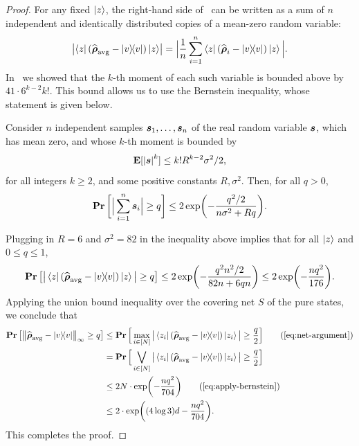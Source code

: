 \documentclass{article}
\begin{document}
\begin{proof}
    For any fixed $\ket{z}$, the right-hand side of~ can be written as a sum of $n$ independent and identically distributed copies of a mean-zero random variable:
    \begin{equation*}
        \abs{\bra{z} (\widehat{\boldsymbol{\rho}}_{\mathrm{avg}} - \ketbra{v}) \ket{z}} = 
        \Big|\frac{1}{n}\sum_{i=1}^n \bra{z} (\widehat{\boldsymbol{\rho}}_i - \ketbra{v}) \ket{z}\Big|.
    \end{equation*}
    In~ we showed that the $k$-th moment of each such variable is bounded above by $41 \cdot 6^{k-2} k!$. This bound allows us to use the Bernstein inequality, whose statement is given below.
    \begin{theorem}
        Consider $n$ independent samples $\boldsymbol{s}_1, \dots, \boldsymbol{s}_n$ of the real random variable $\boldsymbol{s}$, which has mean zero, and whose $k$-th moment is bounded by
        \begin{equation*}
            \mathop{\bf E\/}[\abs{\boldsymbol{s}}^k]\leq k!R^{k-2}\sigma^2/2,
        \end{equation*}
        for all integers $k \geq 2$, and some positive constants $R, \sigma^2$. Then, for all $q > 0$,
        \begin{equation*}
            \mathop{\bf Pr\/}\bigg[\Big|\sum_{i=1}^n \boldsymbol{s}_i\Big| \geq q\bigg] \leq 2 \exp(-\frac{q^2/2}{n\sigma^2 + Rq}).
        \end{equation*}
    \end{theorem}
    \noindent Plugging in $R = 6$ and $\sigma^2 = 82$ in the inequality above implies that for all $\ket{z}$ and $0 \leq q \leq 1$,
    \begin{equation}
        \label{eq:apply-bernstein}
        \mathop{\bf Pr\/}\big[\big|\bra{z} (\widehat{\boldsymbol{\rho}}_{\mathrm{avg}} - \ketbra{v}) \ket{z}\big| \geq q\big] \leq 2\exp(-\frac{q^2n^2/2}{82n + 6qn}) \leq 2\exp(-\frac{nq^2}{176}).
    \end{equation}
    Applying the union bound inequality over the covering net $S$ of the pure states, we conclude that 
    \begin{align*}
        \Pr\big[\norm{\widehat{\brho}_{\mathrm{avg}} - \ketbra{v}}_{\infty} \geq q\big]
        &\leq \Pr\Big[\max_{i \in [N]} \big|\bra{z_i} (\widehat{\brho}_{\mathrm{avg}} - \ketbra{v}) \ket{z_i}\big| \geq \frac{q}{2}\Big] \tag{\Cref{eq:net-argument}} \\
        &= \Pr\Big[\bigvee_{i \in [N]} \big|\bra{z_i} (\widehat{\brho}_{\mathrm{avg}} - \ketbra{v}) \ket{z_i}\big| \geq \frac{q}{2}\Big]  \\
        &\leq 2N \cdot\exp(-\frac{nq^2}{704}) \tag{\Cref{eq:apply-bernstein}} \\
        &\leq 2 \cdot \exp((4\log 3)d-\frac{nq^2}{704}).
    \end{align*}
    This completes the proof.
\end{proof}
\end{document}
